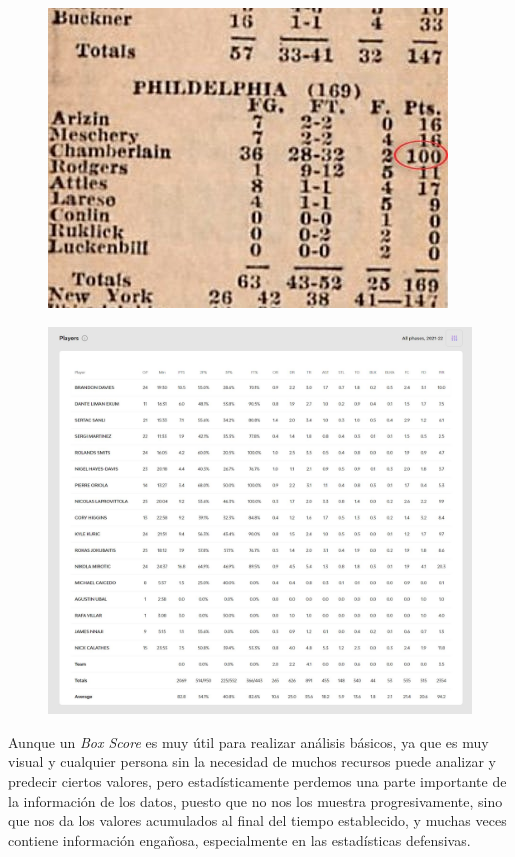 \documentclass[paper=a4, fontsize=9pt]{article}
\begin{document}
\begin{figure}[H]
\centering
\begin{minipage}{.5\textwidth}
\centering
\captionsetup{width=.7\linewidth}
\includegraphics[width=.6\linewidth]{imagenes/BoxScore1962.jpg}
\label{fig:BoxScore1962}
\end{minipage}%
\begin{minipage}{.5\textwidth}
\centering
\captionsetup{width=.6\linewidth}
\includegraphics[width=.5\linewidth]{imagenes/BoxScore2022.jpg}
\label{fig:BoxScore2022}
\end{minipage}
\end{figure}

Aunque un \emph{Box Score} es muy útil para realizar análisis básicos, ya que es muy visual y cualquier persona sin la necesidad de muchos recursos puede analizar y predecir ciertos valores, pero estadísticamente perdemos una parte importante de la información de los datos, puesto que no nos los muestra progresivamente, sino que nos da los valores acumulados al final del tiempo establecido, y muchas veces contiene información engañosa, especialmente en las estadísticas defensivas.
\end{document}
